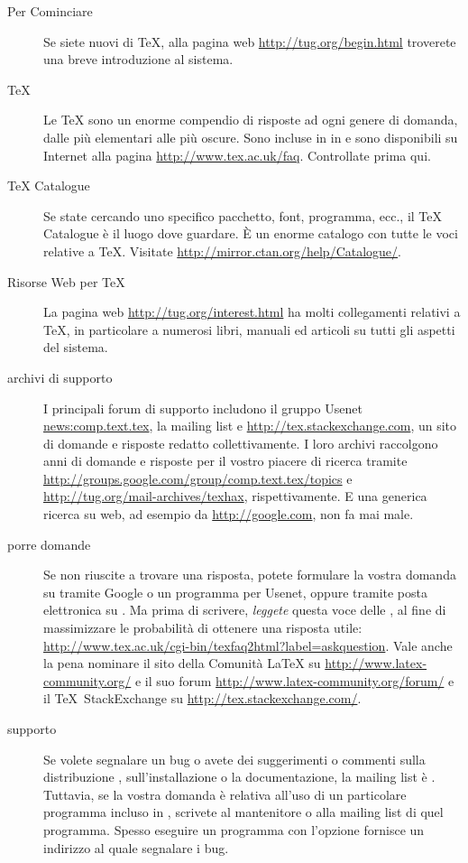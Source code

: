 \documentclass{article}
\begin{document}
\begin{description}
\item [Per Cominciare] Se siete nuovi di \TeX, alla pagina web
  \url{http://tug.org/begin.html} troverete una breve introduzione al sistema.

\item [\TeX{} ] Le \TeX{}  sono un enorme compendio di
  risposte ad ogni genere di domanda, dalle più elementari alle più
  oscure. Sono incluse in \TL{} in
   e sono disponibili
  su Internet alla pagina \url{http://www.tex.ac.uk/faq}. Controllate
  prima qui.

\item [\TeX{} Catalogue] Se state cercando uno specifico pacchetto, font,
  programma, ecc., il \TeX{} Catalogue è il luogo dove guardare. È un
  enorme catalogo con tutte le voci relative a \TeX. Visitate
  \url{http://mirror.ctan.org/help/Catalogue/}.


\item [Risorse Web per \TeX{}] La pagina web
  \url{http://tug.org/interest.html} ha molti collegamenti relativi a
  \TeX, in particolare a numerosi libri, manuali ed articoli su tutti
  gli aspetti del sistema.

\item [archivi di supporto] I principali forum di supporto includono
  il gruppo Usenet \url{news:comp.text.tex}, la mailing list
   e \url{http://tex.stackexchange.com}, un sito
  di domande e risposte redatto collettivamente. I loro archivi
  raccolgono anni di domande e risposte per il vostro piacere di ricerca
  tramite \url{http://groups.google.com/group/comp.text.tex/topics} e
  \url{http://tug.org/mail-archives/texhax}, rispettivamente. E una
  generica ricerca su web, ad esempio da \url{http://google.com}, non fa
  mai male.

\item [porre domande] Se non riuscite a trovare una risposta, potete
  formulare la vostra domanda su  tramite Google o
  un programma per Usenet, oppure tramite posta elettronica su
  . Ma prima di scrivere, \emph{leggete} questa voce
  delle , al fine di massimizzare le probabilità di ottenere una
  risposta utile:
  \url{http://www.tex.ac.uk/cgi-bin/texfaq2html?label=askquestion}.
  Vale anche la pena nominare il sito della Comunità \LaTeX{} su
  \url{http://www.latex-community.org/} e il suo forum
  \url{http://www.latex-community.org/forum/} e il \TeX\ StackExchange su
  \url{http://tex.stackexchange.com/}.

\item [supporto \TL{}] Se volete segnalare un bug o avete dei suggerimenti o
  commenti sulla distribuzione \TL{}, sull'installazione o la
  documentazione, la mailing list è . Tuttavia, se
  la vostra domanda è relativa all'uso di un particolare programma incluso in
  \TL{}, scrivete al mantenitore o alla mailing list di quel programma.
  Spesso eseguire un programma con l'opzione  fornisce un
  indirizzo al quale segnalare i bug.

\end{description}
\end{document}
